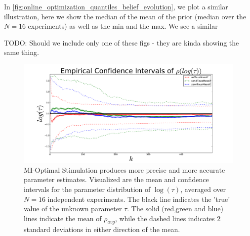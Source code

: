 \documentclass{article}
\begin{document}
In \cref{fig:online_optimization_quantiles_belief_evolution}, we plot a similar
illustration, here we show the median of the mean of the prior (median over the
$N=16$ experiments) as well as the min and the max. We see a similar 

TODO: Should we include only one of these figs - they are kinda showing the
same thing.
 
\begin{figure}[htp]
\begin{center}
  \includegraphics[width=\textwidth]{Figs/HTOnlineEstimator/aggregated_belief_distn_aggregated_ensemble_distn_evolution.pdf}
  \caption[MI-Optimal Stimulation produces more precise parameter estimates]
  {MI-Optimal Stimulation produces more precise and more accurate parameter
  estimates. Visualized are the mean and confidence intervals for the parameter
  distribution of $\log (\tau)$, averaged over $N=16$ independent
  experiments. The black line indicates the 'true' value of the unknown parameter $\tau$.
  The solid (red,green and blue) lines indicate the mean of $\rho_{avg}$, while
  the dashed lines indicates 2 standard deviations in either direction of the
  mean. }  
  \label{fig:online_optimization_aggregated_belief_evolution}
\end{center}
\end{figure}
\end{document}
